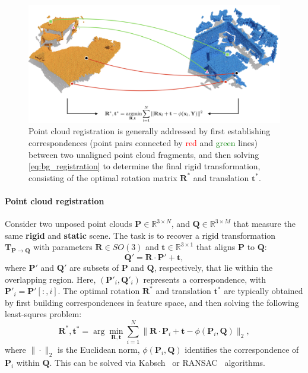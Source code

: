 \begin{figure}[t]
    \centering
    \includegraphics[width=0.8\columnwidth]{imgs/registration.png}
    \caption{Point cloud registration is generally addressed by first establishing correspondences (point pairs connected by \textcolor{red}{red} and \textcolor{green}{green} lines) between two unaligned point cloud fragments, and then solving \cref{eq:bg_registration} to determine the final rigid transformation, consisting of the optimal rotation matrix $\mathbf{R}^*$ and translation $\mathbf{t}^*$.}
    \label{fig:bg_registration}
\end{figure}

\paragraph{Point cloud registration}
Consider two unposed point clouds $\mathbf{P} \in \mathbb{R}^{3 \times N} $, and $\mathbf{Q} \in \mathbb{R}^{3 \times M}$ that measure the same \textbf{rigid} and \textbf{static} scene. The task is to recover a rigid transformation $\mathbf{T}_{\mathbf{P} \rightarrow \mathbf{Q}}$ with parameters $\mathbf{R} \in SO(3)$ and $\mathbf{t} \in \mathbb{R}^{3 \times 1}$ that aligns %
$\mathbf{P}$ to $\mathbf{Q}$:
\begin{equation}
    \mathbf{Q}' = \mathbf{R} \cdot \mathbf{P}' + \mathbf{t},
\end{equation}
where $\mathbf{P}'$ and $\mathbf{Q}'$ are subsets of $\mathbf{P}$ and $\mathbf{Q}$, respectively, that lie within the overlapping region. Here, $(\mathbf{P}'_i, \mathbf{Q}'_i)$ represents a correspondence, with $\mathbf{P}'_i = \mathbf{P}'[:,i]$.  The optimal rotation $\mathbf{R}^*$ and translation $\mathbf{t}^*$ are typically obtained by first building correspondences in feature space, and then solving the following least-squres problem:
\begin{equation}
    \mathbf{R}^*, \mathbf{t}^* = \arg \min_{\mathbf{R}, \mathbf{t}} \sum_{i=1}^N \| \mathbf{R} \cdot \mathbf{P}_i + \mathbf{t} - \phi(\mathbf{P}_i, \mathbf{Q}) \|_2,
\label{eq:bg_registration}
\end{equation}
where $\|\!\cdot\!\|_2$ is the Euclidean norm, $\phi(\mathbf{P}_i, \mathbf{Q})$ identifies the correspondence of $\mathbf{P}_i$ within $\mathbf{Q}$. This can be solved via Kabsch~\cite{kabsch1976solution} or RANSAC~\cite{ransac} algorithms.


